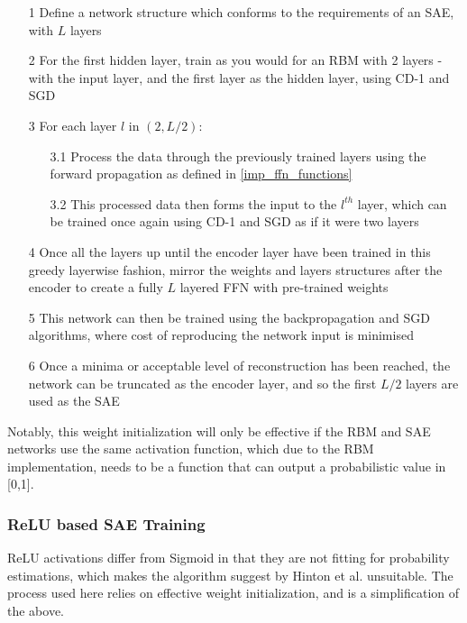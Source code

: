 \documentclass[a4paper,11pt,oneside]{article}
\theoremstyle{plain}
\theoremstyle{definition}
\begin{document}
\begin{itemize}
	\item [1] Define a network structure which conforms to the requirements of an SAE, with $L$ layers
	\item [2] For the first hidden layer, train as you would for an RBM with 2 layers - with the input layer, and the first layer as the hidden layer, using CD-1 and SGD
	\item [3] For each layer $l$ in $(2, L/2)$:
	\begin{itemize}
		\item [3.1] Process the data through the previously trained layers using the forward propagation as defined in \ref{imp_ffn_functions}
		\item [3.2] This processed data then forms the input to the $l^{th}$ layer, which can be trained once again using CD-1 and SGD as if it were two layers
	\end{itemize}
	\item[4] Once all the layers up until the encoder layer have been trained in this greedy layerwise fashion, mirror the weights and layers structures after the encoder to create a fully $L$ layered FFN with pre-trained weights
	\item [5] This network can then be trained using the backpropagation and SGD algorithms, where cost of reproducing the network input is minimised
	\item [6] Once a minima or acceptable level of reconstruction has been reached, the network can be truncated as the encoder layer, and so the first $L/2$ layers are used as the SAE
\end{itemize}

Notably, this weight initialization will only be effective if the RBM and SAE networks use the same activation function, which due to the RBM implementation, needs to be a function that can output a probabilistic value in [0,1].

\subsubsection{ReLU based SAE Training}\label{imp_relusae}

ReLU activations differ from Sigmoid in that they are not fitting for probability estimations, which makes the algorithm suggest by Hinton et al. unsuitable. The process used here relies on effective weight initialization, and is a simplification of the above.
\end{document}
